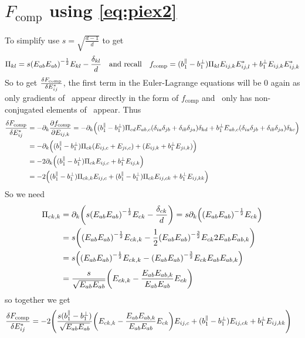 \documentclass[11pt]{article}
\begin{document}
\section{$F_\text{comp}$ using \cref{eq:piex2}}
To simplify use $s=\sqrt{\frac{d-1}{d}}$ to get
\begin{equation}
    \Pi_{kl} = s \qty(E_{ab}E_{ab})^{-\frac{1}{2}}E_{kl} - \frac{\delta_{kl}}{d} \qq{and recall} f_\text{comp} = (b_1^\parallel - b_1^\perp) \Pi_{kl} E_{ij,k}E_{ij,l}^* + b_1^\perp E_{ij,k}E_{ij,k}^*
\end{equation}
So to get $\fdv{F_\text{comp}}{E_{ij}^*}$, the first term in the Euler-Lagrange equations will be 0 again as only gradients of \EE\ appear directly in the form of $f_\text{comp}$ and \PP\ only has non-conjugated elements of \EE\ appear.
Thus
\begin{align}
    \fdv{F_\text{comp}}{E_{ij}^*} &= -\pp_k \pdv{f_\text{comp}}{E_{ij,k}} = -\pp_k \qty((b_1^\parallel - b_1^\perp) \Pi_{cd} E_{ab,c} (\ddelta{i}{j}{a}{b})\delta_{kd} + b_1^\perp E_{ab,c}(\ddelta{i}{j}{a}{b})\delta_{kc}) \\
    &= -\pp_k \qty((b_1^\parallel - b_1^\perp) \Pi_{ck} (E_{ij,c} + E_{ji,c}) + (E_{ij,k} + b_1^\perp E_{ji,k})) \\
    &= -2\pp_k \qty((b_1^\parallel - b_1^\perp) \Pi_{ck} E_{ij,c} + b_1^\perp E_{ij,k}) \\
    &= -2\qty((b_1^\parallel - b_1^\perp) \Pi_{ck,k} E_{ij,c} + (b_1^\parallel - b_1^\perp) \Pi_{ck} E_{ij,ck} + b_1^\perp E_{ij,kk})
\end{align}
So we need
\begin{align}
    \Pi_{ck,k} &= \partial_k \qty( s \qty(E_{ab}E_{ab})^{-\frac{1}{2}}E_{ck} - \frac{\delta_{ck}}{d}) = s \partial_k \qty( \qty(E_{ab}E_{ab})^{-\frac{1}{2}}E_{ck}) \\
    &= s \qty(\qty(E_{ab}E_{ab})^{-\frac{1}{2}}E_{ck,k} - \frac{1}{2}\qty(E_{ab}E_{ab})^{-\frac{3}{2}}E_{ck}2E_{ab}E_{ab,k}) \\
    &= s \qty(\qty(E_{ab}E_{ab})^{-\frac{1}{2}}E_{ck,k} - \qty(E_{ab}E_{ab})^{-\frac{3}{2}}E_{ck}E_{ab}E_{ab,k}) \\
    &= \frac{s}{\sqrt{E_{ab}E_{ab}}} \qty(E_{ck,k} - \frac{E_{ab}E_{ab,k}}{E_{ab}E_{ab}}E_{ck})
\end{align}
so together we get
\begin{align}
    \fdv{F_\text{comp}}{E_{ij}^*} &= -2\qty(\frac{s(b_1^\parallel - b_1^\perp)}{\sqrt{E_{ab}E_{ab}}} \qty(E_{ck,k} - \frac{E_{ab}E_{ab,k}}{E_{ab}E_{ab}}E_{ck}) E_{ij,c} + (b_1^\parallel - b_1^\perp) E_{ij,ck} + b_1^\perp E_{ij,kk})
\end{align}
\end{document}
